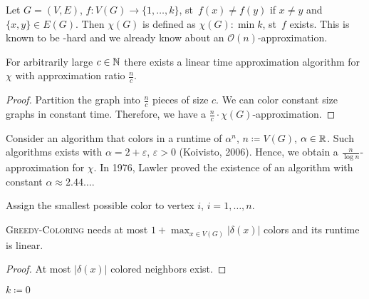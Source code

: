 \documentclass[../skript.tex]{subfiles}
\begin{document}
Let $G = (V, E)$, $f : V(G) \to \{ 1, \ldots, k\}$, \ac{st}~$f(x) \neq f(y)$ if $x \neq y$ and $\{ x, y \} \in E(G)$. Then $\chi(G)$ is defined as $\chi(G) : \min k$, \ac{st}~$f$ exists. This is known to be \NP-hard and we already know about an $\mathcal{O}(n)$-approximation.
\begin{proposition} %
\label{prop:32}
For arbitrarily large $c \in \mathbb{N}$ there exists a linear time approximation algorithm for $\chi$ with approximation ratio $\frac{n}{c}$.
\end{proposition}
\begin{proof}
Partition the graph into $\frac{n}{c}$ pieces of size $c$. We can color constant size graphs in constant time. Therefore, we have a $\frac{n}{c} \cdot \chi(G)$-approximation.
\end{proof}
Consider an algorithm that colors in a runtime of $\alpha^n$, $n \coloneqq V(G)$, $\alpha \in \mathbb{R}$. Such algorithms exists with $\alpha = 2 + \varepsilon$, $\varepsilon > 0$ (Koivisto, 2006). Hence, we obtain a $\frac{n}{\log n}$-approximation for $\chi$. In 1976, Lawler proved the existence of an algorithm with constant $\alpha \approx 2.44\ldots$.
\begin{algorithmbox}
\end{algorithmbox}
\vspace{-7pt}
\begin{algorithm}[H]
Assign the smallest possible color to vertex $i$, $i = 1, \ldots, n$.\;
\end{algorithm}
\vspace{-7pt}
\EndAlgorithmLine
\begin{theorem} %
\textsc{Greedy-Coloring} needs at most $1 + \max_{x \in V(G)} |\delta(x)|$ colors and its runtime is linear.
\end{theorem}
\begin{proof}
At most $|\delta(x)|$ colored neighbors exist.
\end{proof}
\begin{algorithmbox}
\end{algorithmbox}
\vspace{-7pt}
\begin{algorithm}[H]
$k \coloneqq 0$\;
\end{algorithm}
\vspace{-7pt}
\end{document}
